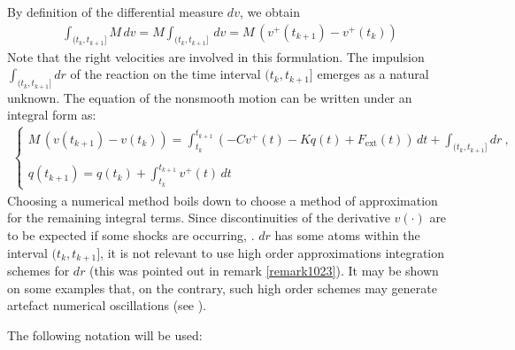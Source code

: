 By definition of the differential measure $dv$, we obtain
\begin{eqnarray}
\label{eq:19}
&  \displaystyle \int_{(t_k,t_{k+1}]} M \,dv = M \int_{(t_k,t_{k+1}]}\,dv = M\,(v^+(t_{k+1})-v^+(t_{k}))  &
\end{eqnarray}
Note that the right velocities are involved in this formulation.  The impulsion $\displaystyle \int_{(t_k,t_{k+1}]} dr$ of the reaction on the time interval $(t_k,t_{k+1}]$ emerges  as a natural unknown. The equation of the nonsmooth motion can be written under an integral form as:
\begin{eqnarray}
  \begin{cases}
     M\,(v(t_{k+1})-v(t_{k})) =   \displaystyle   \int_{t_k}^{t_{k+1}} (- C v^+(t)
      - K q(t) +  F_{\mathrm{ext}}(t))\,dt +
        \displaystyle \int_{(t_k,t_{k+1}]} dr \:, \\ \\
     q(t_{k+1}) = q(t_{k}) + \displaystyle \int_{t_k}^{t_{k+1}} v^+(t)\,dt
   \end{cases}
\end{eqnarray}
%
Choosing a numerical method boils down to choose a method of approximation for the remaining integral terms. Since discontinuities of the derivative  $v(\cdot)$ are to be expected if some shocks are occurring, \ie{}. $dr$  has some  atoms within the interval $(t_k,t_{k+1}]$, it is not relevant to use high order approximations  integration schemes for $dr$ (this was pointed out in remark \ref{remark1023}). It may be shown on some examples that, on the contrary, such high order schemes may generate artefact numerical oscillations (see \citep{Vola.Pratt.ea98}).




The following notation will be used:


